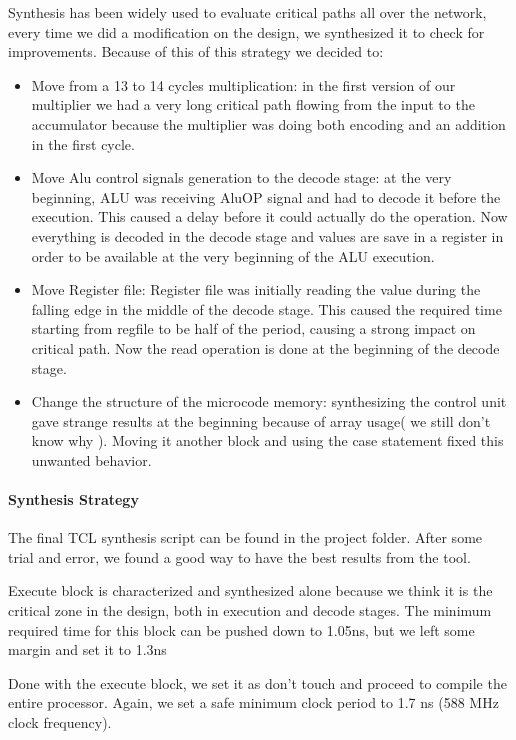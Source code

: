 \documentclass[12pt]{article}
\begin{document}
Synthesis has been widely used to evaluate critical paths all over the network, every time we did a modification on the design, we synthesized it to check for improvements. 
Because of this of this strategy we decided to:
\begin{itemize}
	\item Move from a 13 to 14 cycles multiplication: in the first version of our multiplier we had a very long critical path flowing from the input to the accumulator because the multiplier was doing both encoding and an addition in the first cycle.
	\item Move Alu control signals generation to the decode stage: at the very beginning, ALU was receiving AluOP signal and had to decode it before the execution. This caused a delay before it could actually do the operation. Now everything is decoded in the decode stage and values are save in a register in order to be available at the very beginning of the ALU execution.
	\item Move Register file: Register file was initially reading the value during the falling edge in the middle of the decode stage. This caused the required time starting from regfile to be half of the period, causing a strong impact on critical path. Now the read operation is done at the beginning of the decode stage.
	\item Change the structure of the microcode memory: synthesizing the control unit gave strange results at the beginning because of array usage( we still don't know why ). Moving it another block and using the case statement fixed this unwanted behavior. 
\end{itemize}

\paragraph{Synthesis Strategy}
The final TCL synthesis script can be found in the project folder. After some trial and error, we found a good way to have the best results from the tool.

Execute block is characterized and synthesized alone because we think it is the critical zone in the design, both in execution and decode stages. 
The minimum required time for this block can be pushed down to 1.05ns, but we left some margin and set it to 1.3ns

Done with the execute block, we set it as don't touch and proceed to compile the entire processor.
Again, we set a safe minimum clock period to 1.7 ns (588 MHz clock frequency).
\end{document}
